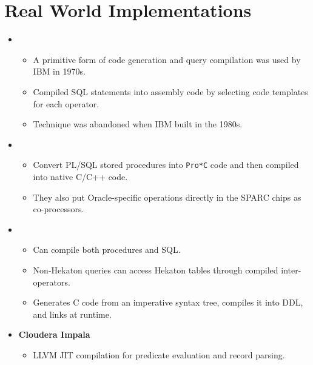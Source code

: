 \documentclass[11pt]{article}
\begin{document}
\section{Real World Implementations}
\begin{itemize}
    \item {}~\cite{chamberlin81}
    \begin{itemize}
        \item
        A primitive form of code generation and query compilation was used by IBM in 1970s.
        
        \item
        Compiled SQL statements into assembly code by selecting code templates for each 
        operator.
        
        \item
        Technique was abandoned when IBM built  in the 1980s.
    \end{itemize}
    
    \item {}
    \begin{itemize}
        \item
        Convert PL/SQL stored procedures into \texttt{Pro*C} code and then compiled into native 
        C/C++ code.
        
        \item
        They also put Oracle-specific operations directly in the SPARC chips as co-processors.
    \end{itemize}
    
    \item {}~\cite{freedman14}
    \begin{itemize}
        \item
        Can compile both procedures and SQL.
        
        \item
        Non-Hekaton queries can access Hekaton tables through compiled inter-operators.
        
        \item
        Generates C code from an imperative syntax tree, compiles it into DDL, and links at 
        runtime.
    \end{itemize}
    
    \item \textbf{Cloudera Impala}~\cite{kornacker15}
    \begin{itemize}
        \item
        LLVM JIT compilation for predicate evaluation and record parsing.
        

\end{itemize}
\end{itemize}
\end{document}
